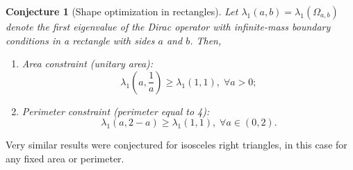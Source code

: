 \documentclass[5p,authoryear]{elsarticle}
\newtheorem{conjecture}[theorem]{Conjecture}
\begin{document}
\begin{conjecture}[Shape optimization in rectangles]\label{david_conjectures}
    \sloppy Let \(\lambda_1(a, b) = \lambda_1(\Omega_{a, b})\) denote the first eigenvalue of the Dirac operator with infinite-mass boundary conditions in a rectangle with sides \(a\) and \(b\). Then,
    \begin{enumerate}
        \item \label{david_conjectures_1} \textit{Area constraint (unitary area): } \[\lambda_1(a, \frac{1}{a}) \geq \lambda_1(1, 1), \; \forall a>0; \]
        \item  \label{david_conjectures_2} \textit{Perimeter constraint (perimeter equal to 4): } \[\lambda_1(a, 2-a) \geq \lambda_1(1, 1), \; \forall a\in (0, 2).\]
    \end{enumerate}
\end{conjecture}
Very similar results were conjectured for isosceles right triangles, in this case for any fixed area or perimeter.
\end{document}
